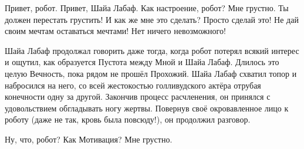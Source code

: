 {\small \begin{dialog}
\X Привет, робот.
\R Привет, Шайа Лабаф.
\X Как настроение, робот?
\R Мне грустно.
\X Ты должен перестать грустить!
\R И как же мне это сделать?
\X Просто сделай это! Не дай своим мечтам оставаться мечтами! Нет ничего невозможного!
\end{dialog}

\begin{monolog}
Шайа Лабаф продолжал говорить даже тогда, когда робот потерял всякий интерес и ощутил, как образуется Пустота между Мной и Шайа Лабаф. Длилось это целую Вечность, пока рядом не прошёл Прохожий. Шайа Лабаф схватил топор и набросился на него, со всей жестокостью голливудского актёра отрубая конечности одну за другой. Закончив процесс расчленения, он принялся с удовольствием обгладывать ногу жертвы. Повернув своё окровавленное лицо к роботу (даже не так, кровь была повсюду!), он продолжил разговор.
\end{monolog}

\begin{dialog}
\X Ну, что, робот? Как Мотивация?
\R Мне грустно.
\end{dialog}}